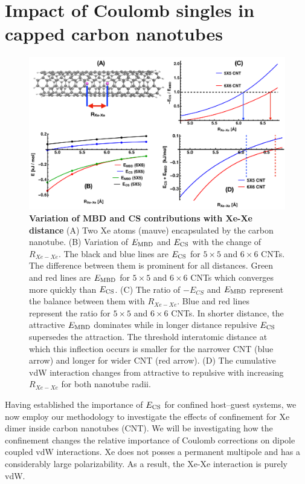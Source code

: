 \documentclass[aps,prl,groupaddress, twocolumn]{revtex4-1}  %
\begin{document}
\section*{Impact of Coulomb singles in capped carbon nanotubes}
\begin{figure}[hbtp]
\includegraphics[scale=0.5, width=\textwidth]{Plots/CNTplots.pdf}
\caption{\textbf{Variation of MBD and CS contributions with Xe-Xe distance} (A) Two Xe atoms (mauve) encapsulated by the carbon nanotube. (B) Variation of $E_{\rm MBD}$ and $E_{\rm CS}$ with the change of $R_{Xe-Xe}$. The black and blue lines are $E_{\rm CS}$ for $5 \times 5$ and $6 \times 6$ CNTs. The difference between them is prominent for all distances. Green and red lines are $E_{\rm MBD}$ for $5 \times 5$ and $6 \times 6$ CNTs which converges more quickly than $E_{\rm CS}$. (C) The ratio of $-E_{CS}$ and $E_{\rm MBD}$ represent the balance between them with $R_{Xe-Xe}$. Blue and red lines represent the ratio for $5\times5$ and $6\times6$ CNTs. In shorter distance, the attractive $E_{\rm MBD}$ dominates while in longer distance repulsive $E_{\rm CS}$ supersedes the attraction. The threshold interatomic distance at which this inflection occurs is smaller for the narrower CNT (blue arrow) and longer for wider CNT (red arrow). (D) The cumulative vdW interaction changes from attractive to repulsive with increasing $R_{Xe-Xe}$ for both nanotube radii.}\label{fig:CNT}
\end{figure}
Having established the importance of $E_{\rm CS}$ for confined host--guest systems, we now employ our methodology to investigate the effects of confinement for Xe dimer inside carbon nanotubes (CNT). We will be investigating how the confinement changes the relative importance of Coulomb corrections on dipole coupled vdW interactions. Xe does not posses a permanent multipole and has a considerably large polarizability. As a result, the Xe-Xe interaction is purely vdW.
\end{document}

